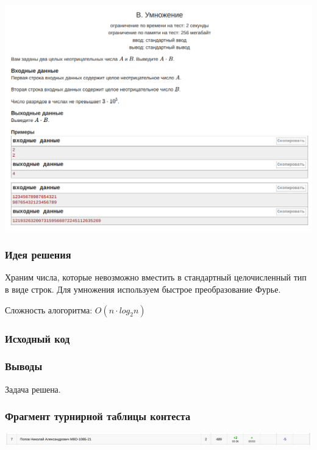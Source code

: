 \begin{center}
\includegraphics[width=\textwidth]{statements/Contest6B.png}
\end{center}

\subsubsection*{Идея решения}

Храним числа, которые невозможно вместить в стандартный 
целочисленный тип в виде строк. Для умножения используем быстрое 
преобразование Фурье. \newline

Сложность алогоритма: $O(n \cdot log_2 n)$ 

\subsubsection*{Исходный код}


\subsubsection*{Выводы}
Задача решена.

\subsubsection*{Фрагмент турнирной таблицы контеста}
\begin{center}
\includegraphics[width=\textwidth]{standings/Contest6.png}\newline\noindent
\end{center}


